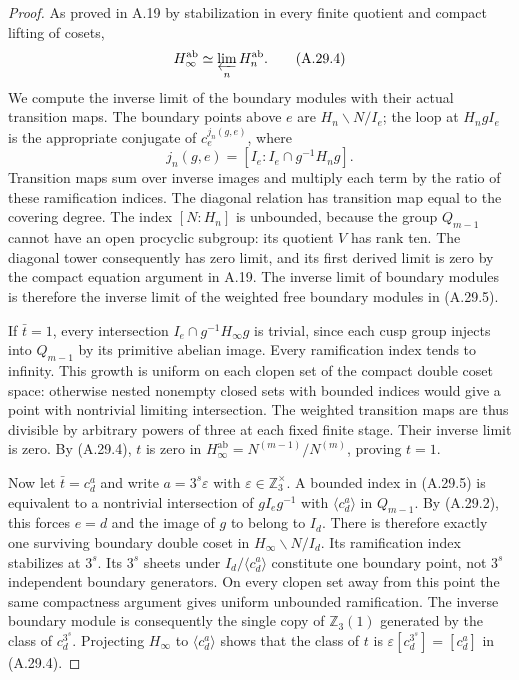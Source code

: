\begin{proof}
As proved in A.19 by stabilization in
every finite quotient and compact
lifting of cosets,
\[
 H_\infty^{\mathrm{ab}}
       \simeq\varprojlim_n H_n^{\mathrm{ab}}.
 \tag{A.29.4}
\]
We compute the inverse limit of the
boundary modules with their actual
transition maps. The boundary points
above $e$ are
$H_n\backslash N/I_e$; the loop at
$H_ngI_e$ is the appropriate conjugate
of $c_e^{j_n(g,e)}$, where
\[
 j_n(g,e)=[I_e:I_e\cap g^{-1}H_ng].
 \tag{A.29.5}
\]
Transition maps sum over inverse images
and multiply each term by the ratio
of these ramification indices. The
diagonal relation has transition map
equal to the covering degree.
The index $[N:H_n]$ is unbounded,
because the group $Q_{m-1}$ cannot
have an open procyclic subgroup:
its quotient $V$ has rank ten.
The diagonal tower consequently has
zero limit, and its first derived
limit is zero by the compact equation
argument in A.19. The inverse limit
of boundary modules is therefore the
inverse limit of the weighted free
boundary modules in (A.29.5).

If $\bar t=1$, every intersection
$I_e\cap g^{-1}H_\infty g$ is trivial,
since each cusp group injects into
$Q_{m-1}$ by its primitive abelian image.
Every ramification index tends to
infinity. This growth is uniform on
each clopen set of the compact double
coset space: otherwise nested nonempty
closed sets with bounded indices would
give a point with nontrivial limiting
intersection. The weighted transition
maps are thus divisible by arbitrary
powers of three at each fixed finite
stage. Their inverse limit is zero.
By (A.29.4), $t$ is zero in
$H_\infty^{\mathrm{ab}}
=N^{(m-1)}/N^{(m)}$, proving $t=1$.

Now let $\bar t=c_d^a$ and write
$a=3^s\varepsilon$ with
$\varepsilon\in\mathbb Z_3^\times$.
A bounded index in (A.29.5) is
equivalent to a nontrivial intersection
of $g I_e g^{-1}$ with
$\langle c_d^a\rangle$ in $Q_{m-1}$.
By (A.29.2), this forces $e=d$ and
the image of $g$ to belong to $I_d$.
There is therefore exactly one
surviving boundary double coset
in $H_\infty\backslash N/I_d$.
Its ramification index stabilizes at
$3^s$. Its $3^s$ sheets under
$I_d/\langle c_d^a\rangle$ constitute
one boundary point, not $3^s$
independent boundary generators.
On every clopen set away from this
point the same compactness argument
gives uniform unbounded ramification.
The inverse boundary module is
consequently the single copy of
$\mathbb Z_3(1)$ generated by the
class of $c_d^{3^s}$. Projecting
$H_\infty$ to $\langle c_d^a\rangle$
shows that the class of $t$ is
$\varepsilon[c_d^{3^s}]=[c_d^a]$
in (A.29.4).


\end{proof}
